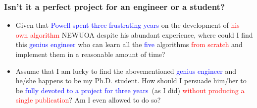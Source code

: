 \documentclass[slidestop,mathserif,xcolor=dvipsnames]{beamer}
\newcommand{\blue}[1]{\textcolor{blue}{#1}}
\newcommand{\red}[1]{\textcolor{red}{#1}}
\begin{document}
\begin{frame}
    \frametitle{Isn't it a perfect project for an engineer or a student?}

    \begin{itemize}
            \vspace{2ex}
        \item Given that \blue{Powell spent three frustrating years} on the development of \red{his own
            algorithm} NEWUOA despite his abundant experience, where could I find this
            \blue{genius engineer} who can learn all the \blue{five} algorithms \red{from scratch} and implement them in
            a reasonable amount of time?
            \vspace{0.5ex}
        \item Assume that I am lucky to find the abovementioned \blue{genius engineer} and he/she happens
            to be my Ph.D. student. How should I persuade him/her to be \blue{fully devoted to
            a project for three years}~(as I did) \red{without producing a single publication}? Am I even allowed to do so?
    \end{itemize}
\end{frame}




\end{document}
